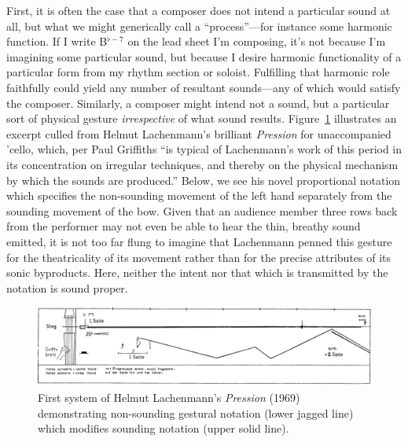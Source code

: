     First, it is often the case that a composer does not intend a particular sound at all, but what we might generically call a ``process''---for instance some harmonic function. If I write B$^{\flat-7}$ on the lead sheet I'm composing, it's not because I'm imagining some particular sound, but because I desire harmonic functionality of a particular form from my rhythm section or soloist. Fulfilling that harmonic role faithfully could yield any number of resultant sounds---any of which would satisfy the composer. Similarly, a composer might intend not a sound, but a particular sort of physical gesture \textit{irrespective} of what sound results. Figure~\ref{fig:pression} illustrates an excerpt culled from Helmut Lachenmann's brilliant \textit{Pression} for unaccompanied 'cello, which, per Paul Griffiths ``is typical of Lachenmann's work of this period in its concentration on irregular techniques, and thereby on the physical mechanism by which the sounds are produced.'' Below, we see his novel proportional notation which specifies the non-sounding movement of the left hand separately from the sounding movement of the bow. Given that an audience member three rows back from the performer may not even be able to hear the thin, breathy sound emitted, it is not too far flung to imagine that Lachenmann penned this gesture for the theatricality of its movement rather than for the precise attributes of its sonic byproducts. Here, neither the intent nor that which is transmitted by the notation is sound proper.\autocite{Griffiths_2011}

        \begin{figure} 
            \centering
            \includegraphics[width=.99\textwidth]{images/chapter2/pression1.png}
            \captionsetup{width=.5\textwidth}
            \caption[First system of Helmut Lachenmann's \textit{Pression} (1969) demonstrating non-sounding ``gestural'' notation (lower jagged line) which modifies sounding notation (upper solid line).]{First system of Helmut Lachenmann's \textit{Pression} (1969) demonstrating non-sounding gestural notation (lower jagged line) which modifies sounding notation (upper solid line).\footnotemark}
            \label{fig:pression}
        \end{figure}

